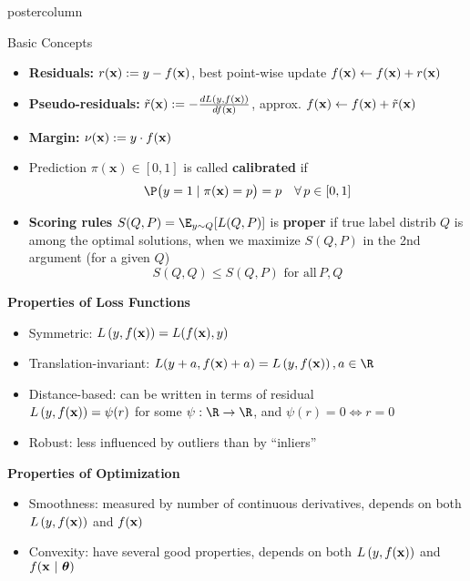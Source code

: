\documentclass{beamer}
\begin{document}
\begin{frame}[fragile]{}
\begin{columns}
\begin{column}{.31\textwidth}
\begin{beamercolorbox}[center]{postercolumn}
\begin{minipage}{.98\textwidth}
{\begin{myblock}{Basic Concepts}
          \begin{itemize}[$\bullet$]
            \setlength{\itemindent}{+.3in}
            \item \textbf{Residuals:} $r(\mathbf{x}) := y - f(\mathbf{x})$, best point-wise update $f(\mathbf{x}) \leftarrow f(\mathbf{x}) + r(\mathbf{x})$
            \item \textbf{Pseudo-residuals:} $\tilde{r}(\mathbf{x}) := - \frac{d L\left(y, f(\mathbf{x})\right)}{d f(\mathbf{x})}$, approx. $f(\mathbf{x}) \leftarrow f(\mathbf{x}) + \tilde{r}(\mathbf{x})$
            \item \textbf{Margin:} $\nu(\mathbf{x}) := y \cdot f(\mathbf{x})$
            \item Prediction $\pi(\mathbf{x})\in[0,1]$ is called \textbf{calibrated} if 
$$\P\bigl(y=1 \mid \pi(\mathbf{x})=p\bigr)=p \quad \forall\, p\in[0,1]$$
            \item \textbf{Scoring rules} $S(Q, P) = \E_{y \sim Q}[L(Q, P)]$ is \textbf{proper} if true label distrib $Q$ is among the optimal solutions, 
          when we maximize $S(Q, P)$ in the 2nd argument (for a given $Q$)
          $$S(Q,Q) \leq S(Q, P) \,\, \text{for all} \, P,Q $$
          \end{itemize}


          \begin{codebox}
            \textbf{Properties of Loss Functions}
          \end{codebox}
          
          \begin{itemize}[$\bullet$]
            \setlength{\itemindent}{+.3in}
            \item Symmetric: $L\left(y, f(\mathbf{x})\right) = L(f(\mathbf{x}), y)$
            \item Translation-invariant: $L(y + a, \fx + a) = \Lxy, a \in \R$
            \item Distance-based: can be written in terms of residual \\
             $L\left(y, f(\mathbf{x})\right) = \psi (r)$ for some $\psi: \R \to \R$, and $\psi(r) = 0 \Leftrightarrow r = 0$
            \item Robust: less influenced by outliers than by “inliers”
          \end{itemize}


          \begin{codebox}
            \textbf{Properties of Optimization}
          \end{codebox}

          \begin{itemize}[$\bullet$]
            \setlength{\itemindent}{+.3in}
            \item Smoothness: measured by number of continuous derivatives, depends on both $L\left(y, f(\mathbf{x})\right)$ and $f(\mathbf{x})$
            \item Convexity: have several good properties, depends on both $L\left(y, f(\mathbf{x})\right)$ and $f(\mathbf{x} ~|~ \bm{\theta})$
          \end{itemize}



\end{myblock}}
\end{minipage}
\end{beamercolorbox}
\end{column}
\end{columns}
\end{frame}
\end{document}
